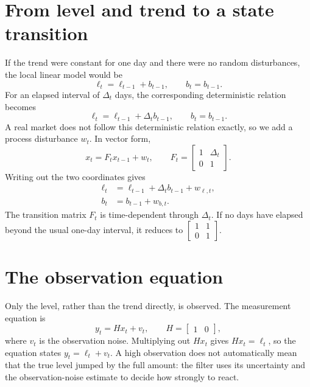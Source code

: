 \documentclass[12pt,a4paper,oneside]{report}
\numberwithin{equation}{chapter}
\numberwithin{figure}{chapter}
\numberwithin{table}{chapter}
\theoremstyle{definition}
\theoremstyle{plain}
\newcommand{\1}{\mathbf{1}}
\begin{document}
\section{From level and trend to a state transition}
If the trend were constant for one day and there were no random disturbances, the local linear model would be
\[
  \ell_t=\ell_{t-1}+b_{t-1},\qquad b_t=b_{t-1}.
\]
For an elapsed interval of $\Delta_t$ days, the corresponding deterministic relation becomes
\[
  \ell_t=\ell_{t-1}+\Delta_tb_{t-1},\qquad b_t=b_{t-1}.
\]
A real market does not follow this deterministic relation exactly, so we add a process disturbance $w_t$. In vector form,
\begin{equation}
  x_t=F_t x_{t-1}+w_t,
  \qquad
  F_t=\begin{bmatrix}1&\Delta_t\\0&1\end{bmatrix}.
  \label{eq:transition}
\end{equation}
Writing out the two coordinates gives
\begin{align}
  \ell_t &= \ell_{t-1}+\Delta_t b_{t-1}+w_{\ell,t},\\
  b_t &= b_{t-1}+w_{b,t}.
\end{align}
The transition matrix $F_t$ is time-dependent through $\Delta_t$. If no days have elapsed beyond the usual one-day interval, it reduces to $\begin{bmatrix}1&1\\0&1\end{bmatrix}$.

\section{The observation equation}
Only the level, rather than the trend directly, is observed. The measurement equation is
\begin{equation}
  y_t=Hx_t+v_t,
  \qquad H=\begin{bmatrix}1&0\end{bmatrix},
  \label{eq:observation}
\end{equation}
where $v_t$ is the observation noise. Multiplying out $Hx_t$ gives $Hx_t=\ell_t$, so the equation states $y_t=\ell_t+v_t$. A high observation does not automatically mean that the true level jumped by the full amount: the filter uses its uncertainty and the observation-noise estimate to decide how strongly to react.
\end{document}

